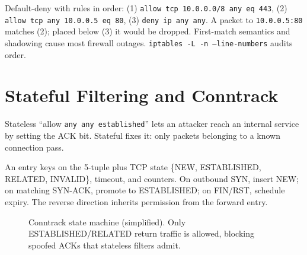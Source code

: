 \begin{example}\label{ex:order}
Default-deny with rules in order: (1) \texttt{allow tcp 10.0.0.0/8 any eq 443},
(2) \texttt{allow tcp any 10.0.0.5 eq 80}, (3) \texttt{deny ip any any}.
A packet to \texttt{10.0.0.5:80} matches (2); placed below (3) it would be
dropped. First-match semantics and shadowing cause most firewall outages.
\texttt{iptables -L -n --line-numbers} audits order.
\end{example}

\section{Stateful Filtering and Conntrack}\label{sec:stateful}
 Stateless ``allow \texttt{any any established}'' lets an attacker reach an
internal service by setting the ACK bit. Stateful fixes it: only packets
belonging to a known connection pass.

\begin{definition}\label{def:conntrack}
An entry keys on the 5-tuple plus TCP state \{NEW, ESTABLISHED, RELATED,
INVALID\}, timeout, and counters. On outbound SYN, insert NEW; on matching
SYN-ACK, promote to ESTABLISHED; on FIN/RST, schedule expiry. The reverse
direction inherits permission from the forward entry.
\end{definition}

\begin{figure}[h]\centering
{}
\caption{Conntrack state machine (simplified). Only ESTABLISHED/RELATED return traffic is allowed, blocking spoofed ACKs that stateless filters admit.}
\label{fig:conntrack}
\end{figure}

